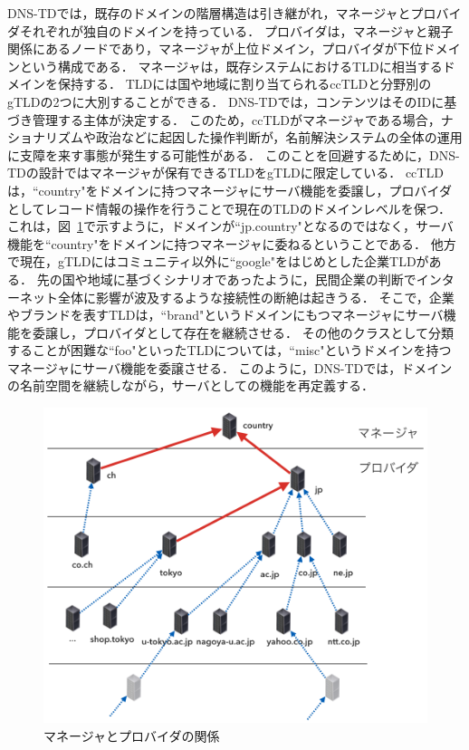 DNS-TDでは，既存のドメインの階層構造は引き継がれ，マネージャとプロバイダそれぞれが独自のドメインを持っている．
プロバイダは，マネージャと親子関係にあるノードであり，マネージャが上位ドメイン，プロバイダが下位ドメインという構成である．
マネージャは，既存システムにおけるTLDに相当するドメインを保持する．
TLDには国や地域に割り当てられるccTLDと分野別のgTLDの2つに大別することができる．
DNS-TDでは，コンテンツはそのIDに基づき管理する主体が決定する．
このため，ccTLDがマネージャである場合，ナショナリズムや政治などに起因した操作判断が，名前解決システムの全体の運用に支障を来す事態が発生する可能性がある．
このことを回避するために，DNS-TDの設計ではマネージャが保有できるTLDをgTLDに限定している．
ccTLDは，``country"をドメインに持つマネージャにサーバ機能を委譲し，プロバイダとしてレコード情報の操作を行うことで現在のTLDのドメインレベルを保つ．
これは，図~\ref{fig:relationship-manager-provider}で示すように，ドメインが``jp.country"となるのではなく，サーバ機能を``country"をドメインに持つマネージャに委ねるということである．
他方で現在，gTLDにはコミュニティ以外に``google"をはじめとした企業TLDがある．
先の国や地域に基づくシナリオであったように，民間企業の判断でインターネット全体に影響が波及するような接続性の断絶は起きうる．
そこで，企業やブランドを表すTLDは，``brand"というドメインにもつマネージャにサーバ機能を委譲し，プロバイダとして存在を継続させる．
その他のクラスとして分類することが困難な``foo"といったTLDについては，``misc"というドメインを持つマネージャにサーバ機能を委譲させる．
このように，DNS-TDでは，ドメインの名前空間を継続しながら，サーバとしての機能を再定義する．
\begin{figure}[htbp]
 \centering
 \includegraphics[scale=0.3]{figure/relationship-manager-provider.png}
 \caption{マネージャとプロバイダの関係}
 \label{fig:relationship-manager-provider}
\end{figure}

